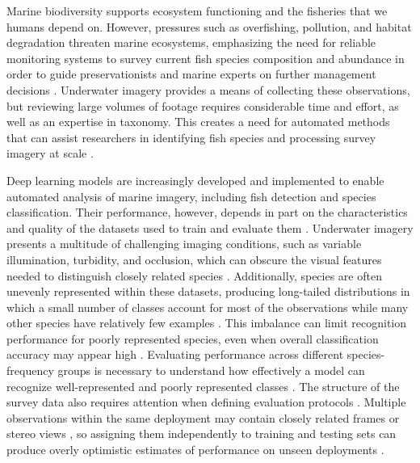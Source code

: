 \documentclass[preprint,12pt]{elsarticle}
\begin{document}
Marine biodiversity supports ecosystem functioning and the fisheries
that we humans depend on. However, pressures such as overfishing,
pollution, and habitat degradation threaten marine ecosystems,
emphasizing the need for reliable monitoring systems to survey current
fish species composition and abundance in order to guide
preservationists and marine experts on further management decisions
\cite{ref1}\cite{ref2}.
Underwater imagery provides a means of collecting these observations,
but reviewing large volumes of footage requires considerable time and
effort, as well as an expertise in
taxonomy\cite{ref3}\cite{ref4}.
This creates a need for automated methods that can assist researchers in
identifying fish species and processing survey imagery at scale
\cite{ref1} \cite{ref5}.

Deep learning models are increasingly developed and implemented to
enable automated analysis of marine imagery, including fish detection
and species
classification\cite{ref6}\cite{ref7}\cite{ref8}.
Their performance, however, depends in part on the characteristics and
quality of the datasets used to train and evaluate
them\cite{ref9}
\cite{ref10}. Underwater imagery presents a
multitude of challenging imaging conditions, such as variable
illumination, turbidity, and occlusion, which can obscure the visual
features needed to distinguish closely related species
\cite{ref8} \cite{ref9}
\cite{ref11}. Additionally, species are often
unevenly represented within these datasets, producing long-tailed
distributions in which a small number of classes account for most of the
observations while many other species have relatively few examples
\cite{ref10}
\cite{ref12}
\cite{ref13}. This imbalance can limit
recognition performance for poorly represented species, even when
overall classification accuracy may appear high
\cite{ref14}
\cite{ref15}. Evaluating performance across
different species-frequency groups is necessary to understand how
effectively a model can recognize well-represented and poorly
represented classes \cite{ref13}
\cite{ref16}. The structure of the survey data
also requires attention when defining evaluation protocols
\cite{ref17}
\cite{ref18}. Multiple observations within the
same deployment may contain closely related frames or stereo views
\cite{ref4}
\cite{ref19}, so assigning them independently to
training and testing sets can produce overly optimistic estimates of
performance on unseen deployments \cite{ref17}
\cite{ref18}
\cite{ref20}.
\end{document}
